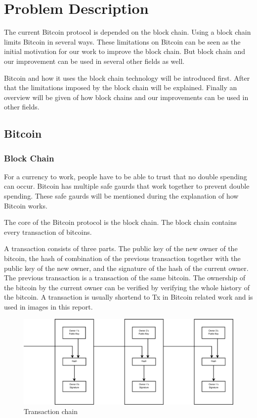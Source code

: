 \chapter{Problem Description}

The current Bitcoin protocol is depended on the block chain. 
Using a block chain limits Bitcoin in several ways.
These limitations on Bitcoin can be seen as the initial motivation 
for our work to improve the block chain.
But block chain and our improvement can be used in several other fields as well.

Bitcoin and how it uses the block chain technology will be introduced first.
After that the limitations imposed by the block chain will be explained.
Finally an overview will be given of how block chains and our improvements can be used in other fields.

\section{Bitcoin}
\subsection{Block Chain}
For a currency to work, people have to be able to trust that no double spending can occur.%
Bitcoin has multiple safe gaurds that work together to prevent double spending.
These safe gaurds will be mentioned during the explanation of how Bitcoin works.

The core of the Bitcoin protocol is the block chain.
The block chain contains every transaction of bitcoins.

A transaction consists of three parts.
The public key of the new owner of the bitcoin,
the hash of combination of the previous transaction together with the public key of the new owner,
and the signature of the hash of the current owner.
The previous transaction is a transaction of the same bitcoin.
The ownership of the bitcoin by the current owner can be verified
by verifying the whole history of the bitcoin.
A transaction is usually shortend to Tx in Bitcoin related work and is used in images in this report.

\begin{figure}[H]
	\centerline{\includegraphics[scale=0.3]{problemDescription/figs/transactions.eps}}
	\caption{Transaction chain}
\end{figure}

